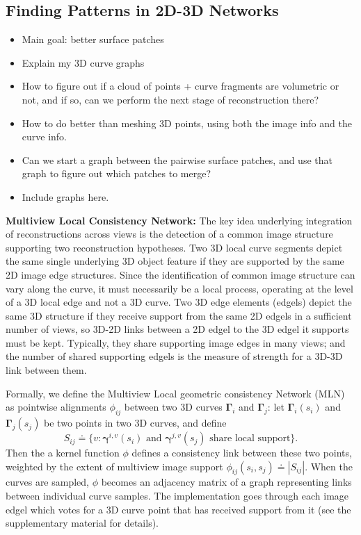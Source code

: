 \documentclass[a4paper,titlepage]{article}
\newcommand{\Gama}{\boldsymbol{\Gamma}}
\newcommand{\gama}{\boldsymbol{\gamma}}
\begin{document}
\subsection{Finding Patterns in 2D-3D Networks}

\begin{itemize}
\item Main goal: better surface patches
\item Explain my 3D curve graphs
\item How to figure out if a cloud of points + curve fragments are volumetric or
  not, and if so, can we perform the next stage of reconstruction there?
\item How to do better than meshing 3D points, using both the image info and the
  curve info.
\item Can we start a graph between the pairwise surface patches, and use that
  graph to figure out which patches to merge?
\item Include graphs here.
\end{itemize}

\textbf{Multiview Local Consistency Network:}
The key idea underlying integration of reconstructions across views is the
detection of a common image structure supporting two reconstruction hypotheses. 
Two 3D local curve segments depict the same single underlying
3D object feature if they are supported by the same 2D image edge structures. 
Since the identification of common image structure can vary along the curve, it
must necessarily be a local process, operating at the level of a 3D local edge
and not a 3D curve. 
Two 3D edge elements (edgels) depict the same 3D structure if they 
receive support from the same 2D edgels in a sufficient number of views, so
3D-2D links between a 2D edgel to the 3D edgel it supports must be kept. Typically,
they share supporting image edges in many views; and the number of shared
supporting edgels is the measure of strength for a 3D-3D link between them.

Formally, we define the Multiview Local
geometric consistency Network (MLN) as pointwise alignments $\phi_{ij}$ between 
two 3D curves $\Gama_i$ and $\Gama_j$: let $\Gama_i(s_i)$ and $\Gama_j(s_j)$ be
two points in two 3D curves, and define
\begin{equation}
S_{ij} \doteq \{v : \gama^{i,v}(s_i) \text{ and } \gama^{j,v}(s_j) \text{ share local support}\}.
\end{equation}
Then the a kernel function $\phi$ defines a consistency link between these two points,
weighted by the extent of multiview image support $\phi_{ij}(s_i,s_j) \doteq
|S_{ij}|$. When the curves are sampled, $\phi$ becomes an adjacency matrix of a
graph representing links between individual curve samples.
The implementation goes through each image edgel which votes for a 3D curve
point that has received support from it (see the supplementary material for
details).
\end{document}
